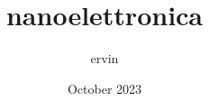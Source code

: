 \documentclass{article}
\title{nanoelettronica}
\author{ervin}
\date{October 2023}
\begin{document}
\maketitle

\doublespacing
\tableofcontents
\singlespacing
\newpage












\begin{appendix}
    \listoffigures
    \listoftables
\end{appendix}
\end{document}
